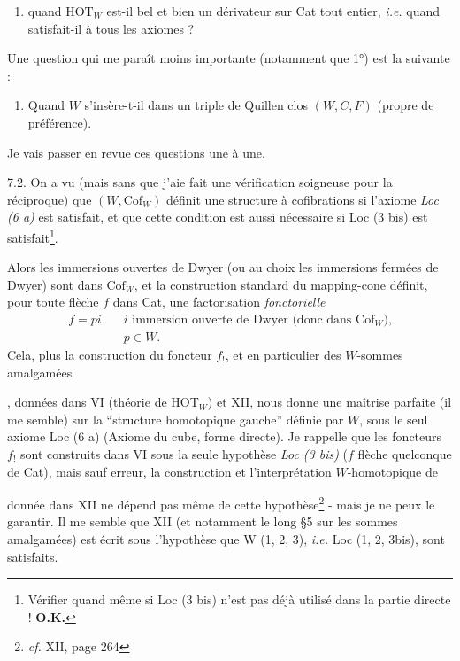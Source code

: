 \documentclass[11pt]{article}
\newcommand{\printedpage}[1]{\marginpar{\footnotesize p.~#1}}
\newcommand{\msp}[1]{\marginpar{\footnotesize [#1]}}
\begin{document}
\printedpage{49}

\begin{enumerate}[label=4)]
\item quand $\mathrm{HOT}_W$ est-il bel et bien un dérivateur sur Cat tout entier, \textit{i.e.} quand satisfait-il à tous les axiomes ?
\end{enumerate}

Une question qui me paraît moins importante (notamment que 1°) est la suivante :

\begin{enumerate}[label=1 bis)]
\item Quand $W$ s'insère-t-il dans un triple de Quillen clos $(W,C,F)$ (propre de préférence).
\end{enumerate}

Je vais passer en revue ces questions une à une.

7.2. On a vu (mais sans que j'aie fait une vérification soigneuse pour la réciproque) que $(W,\mathrm{Cof}_W)$ définit une structure à cofibrations si l'axiome \textit{Loc (6 a)} est satisfait, et que cette condition est aussi nécessaire si Loc (3 bis) est satisfait\footnote[45]{Vérifier quand même si Loc (3 bis) n'est pas déjà utilisé dans la partie directe ! \textbf{O.K.}}.

\msp{page 99}
Alors les immersions ouvertes de Dwyer (ou au choix les immersions fermées de Dwyer) sont dans $\mathrm{Cof}_W$, et la construction standard du mapping-cone définit, pour toute flèche $f$ dans Cat, une factorisation \textit{fonctorielle}
\[
\begin{aligned}
f = pi \quad & i \text{ immersion ouverte de Dwyer (donc dans } \mathrm{Cof}_W\text{),}\\
& p \in W.
\end{aligned}
\]
Cela, plus la construction du foncteur $f_!$, et en particulier des $W$-sommes amalgamées
, données dans VI (théorie de $\mathrm{HOT}_W$) et XII, nous donne une maîtrise parfaite (il me semble) sur la “structure homotopique gauche” définie par $W$, sous le seul axiome Loc (6 a) (Axiome du cube, forme directe). Je rappelle que les foncteurs $f_!$ sont construits dans VI sous la seule hypothèse \textit{Loc (3 bis)} ($f$ flèche quelconque de Cat), mais sauf erreur, la construction
\msp{page 100}
et l'interprétation $W$-homotopique de
donnée dans XII ne dépend pas même de cette hypothèse\footnote[46]{\textit{cf.} XII, page 264} - mais je ne peux le garantir. Il me semble que XII (et notamment le long §5 sur les sommes amalgamées) est écrit sous l'hypothèse que W (1, 2, 3), \textit{i.e.} Loc (1, 2, 3bis), sont satisfaits.
\end{document}
